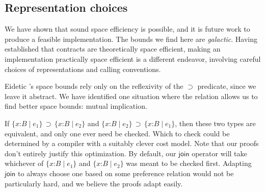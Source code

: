 \documentclass[9pt]{extarticle}
\newcommand{\ottnt}[1]{\mathit{#1}}
\begin{document}
\subsection{Representation choices}
\label{sec:representation}

{\iffull
We have shown that sound space efficiency is possible, and it is future
work to produce a feasible implementation.
\fi}
The bounds we find here are \textit{galactic}. Having established that
contracts are theoretically space efficient, making an implementation
practically space efficient is a different endeavor, involving careful
choices of representations and calling conventions.

Eidetic \lambdah's space bounds rely only on the reflexivity of the
$ \supset $ predicate, since we leave it abstract. We have identified
one situation where the relation allows us to find better space
bounds: mutual implication.

If $ \{ \mathit{x} \mathord{:} \ottnt{B} \mathrel{\mid} \ottnt{e_{{\mathrm{1}}}} \}  \, \supset \,  \{ \mathit{x} \mathord{:} \ottnt{B} \mathrel{\mid} \ottnt{e_{{\mathrm{2}}}} \} $ and $ \{ \mathit{x} \mathord{:} \ottnt{B} \mathrel{\mid} \ottnt{e_{{\mathrm{2}}}} \}  \, \supset \,  \{ \mathit{x} \mathord{:} \ottnt{B} \mathrel{\mid} \ottnt{e_{{\mathrm{1}}}} \} $, then
these two types are equivalent, and only one ever need be
checked. Which to check could be determined by a compiler with a
suitably clever cost model.
Note that our proofs don't entirely justify this optimization. By
default, our $ \mathsf{join} $ operator will take whichever of $ \{ \mathit{x} \mathord{:} \ottnt{B} \mathrel{\mid} \ottnt{e_{{\mathrm{1}}}} \} $
and $ \{ \mathit{x} \mathord{:} \ottnt{B} \mathrel{\mid} \ottnt{e_{{\mathrm{2}}}} \} $ was meant to be checked first. Adapting $ \mathsf{join} $
to always choose one based on some preference relation would not be
particularly hard, and we believe the proofs adapt easily.
\end{document}
